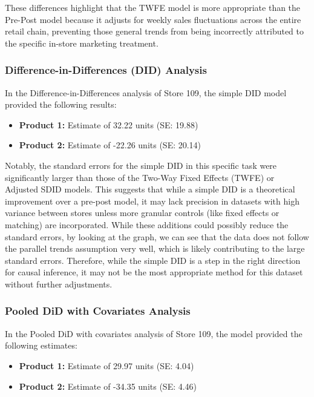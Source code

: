 \documentclass[
  letterpaper,
  DIV=11,
  numbers=noendperiod]{scrartcl}
\providecommand{\tightlist}{%
  \setlength{\itemsep}{0pt}\setlength{\parskip}{0pt}}
\begin{document}
These differences highlight that the TWFE model is more appropriate than
the Pre-Post model because it adjusts for weekly sales fluctuations
across the entire retail chain, preventing those general trends from
being incorrectly attributed to the specific in-store marketing
treatment.

\subsubsection{Difference-in-Differences (DID)
Analysis}\label{difference-in-differences-did-analysis}

In the Difference-in-Differences analysis of Store 109, the simple DID
model provided the following results:

\begin{itemize}
\tightlist
\item
  \textbf{Product 1:} Estimate of 32.22 units (SE: 19.88)
\item
  \textbf{Product 2:} Estimate of -22.26 units (SE: 20.14)
\end{itemize}

Notably, the standard errors for the simple DID in this specific task
were significantly larger than those of the Two-Way Fixed Effects (TWFE)
or Adjusted SDID models. This suggests that while a simple DID is a
theoretical improvement over a pre-post model, it may lack precision in
datasets with high variance between stores unless more granular controls
(like fixed effects or matching) are incorporated. While these additions
could possibly reduce the standard errors, by looking at the graph, we
can see that the data does not follow the parallel trends assumption
very well, which is likely contributing to the large standard errors.
Therefore, while the simple DID is a step in the right direction for
causal inference, it may not be the most appropriate method for this
dataset without further adjustments.

\subsubsection{Pooled DiD with Covariates
Analysis}\label{pooled-did-with-covariates-analysis}

In the Pooled DiD with covariates analysis of Store 109, the model
provided the following estimates:

\begin{itemize}
\tightlist
\item
  \textbf{Product 1:} Estimate of 29.97 units (SE: 4.04)
\item
  \textbf{Product 2:} Estimate of -34.35 units (SE: 4.46)
\end{itemize}
\end{document}
